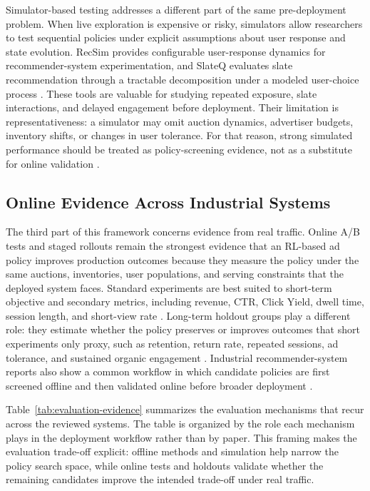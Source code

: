 \documentclass[manuscript,review,screen]{acmart}
\begin{document}
Simulator-based testing addresses a different part of the same pre-deployment problem. When live exploration is expensive or risky, simulators allow researchers to test sequential policies under explicit assumptions about user response and state evolution. RecSim provides configurable user-response dynamics for recommender-system experimentation, and SlateQ evaluates slate recommendation through a tractable decomposition under a modeled user-choice process \cite{ie2019recsim, ie2019slateq}. These tools are valuable for studying repeated exposure, slate interactions, and delayed engagement before deployment. Their limitation is representativeness: a simulator may omit auction dynamics, advertiser budgets, inventory shifts, or changes in user tolerance. For that reason, strong simulated performance should be treated as policy-screening evidence, not as a substitute for online validation \cite{dulac2021challenges}.

\subsection{Online Evidence Across Industrial Systems}
\label{subsec:online-evaluation}

The third part of this framework concerns evidence from real traffic. Online A/B tests and staged rollouts remain the strongest evidence that an RL-based ad policy improves production outcomes because they measure the policy under the same auctions, inventories, user populations, and serving constraints that the deployed system faces. Standard experiments are best suited to short-term objective and secondary metrics, including revenue, CTR, Click Yield, dwell time, session length, and short-view rate \cite{barajas2022online, hohnhold2015focusing}. Long-term holdout groups play a different role: they estimate whether the policy preserves or improves outcomes that short experiments only proxy, such as retention, return rate, repeated sessions, ad tolerance, and sustained organic engagement \cite{hohnhold2015focusing, mcdonald2023impatient}. Industrial recommender-system reports also show a common workflow in which candidate policies are first screened offline and then validated online before broader deployment \cite{gauci2018horizon, chen2022off}.

Table~\ref{tab:evaluation-evidence} summarizes the evaluation mechanisms that recur across the reviewed systems. The table is organized by the role each mechanism plays in the deployment workflow rather than by paper. This framing makes the evaluation trade-off explicit: offline methods and simulation help narrow the policy search space, while online tests and holdouts validate whether the remaining candidates improve the intended trade-off under real traffic.
\end{document}
